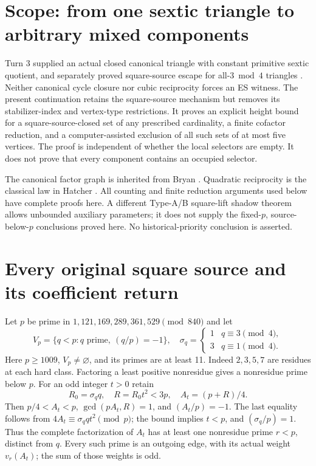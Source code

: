 \section{Scope: from one sextic triangle to arbitrary mixed components}
Turn 3 supplied an actual closed canonical triangle with constant primitive sextic
quotient, and separately proved square-source escape for all-$3\bmod4$ triangles
\cite{Turn3}. Neither canonical cycle closure nor cubic reciprocity forces an ES
witness. The present continuation retains the square-source mechanism but removes
its stabilizer-index and vertex-type restrictions. It proves an explicit height
bound for a square-source-closed set of any prescribed cardinality, a finite
cofactor reduction, and a computer-assisted exclusion of all such sets of at most
five vertices. The proof is independent of whether the local selectors are empty.
It does not prove that every component contains an occupied selector.

The canonical factor graph is inherited from Bryan \cite[\S\S1--7]{Bryan}.
Quadratic reciprocity is the classical law in Hatcher \cite[\S6.4, pp.205--212]{Hatcher}.
All counting and finite reduction arguments used below have complete proofs here.
A different Type-A/B square-lift shadow theorem \cite[\S\S3--6]{Shadow} allows
unbounded auxiliary parameters; it does not supply the fixed-$p$, source-below-$p$
conclusions proved here. No historical-priority conclusion is asserted.

\section{Every original square source and its coefficient return}
Let $p$ be prime in $1,121,169,289,361,529\pmod{840}$ and let
\[
 V_p=\{q<p:q\text{ prime},\ (q/p)=-1\},\quad
 \sigma_q=\begin{cases}1&q\equiv3\pmod4,\\3&q\equiv1\pmod4.\end{cases}
\]
Here $p\ge1009$, $V_p\ne\varnothing$, and its primes are at least 11.
Indeed $2,3,5,7$ are residues at each hard class. Factoring a least positive
nonresidue gives a nonresidue prime below $p$. For an odd integer $t>0$ retain
\[
 R_0=\sigma_q q,\quad R=R_0t^2<3p,\quad A_t=(p+R)/4.
                                                        \tag{1}
\]
Then $p/4<A_t<p$, $\gcd(pA_t,R)=1$, and $(A_t/p)=-1$. The last equality follows
from $4A_t\equiv\sigma_q q t^2\pmod p$; the bound implies $t<p$, and
$(\sigma_q/p)=1$. Thus the complete factorization of $A_t$ has at least one
nonresidue prime $r<p$, distinct from $q$. Every such prime is an outgoing edge,
with its actual weight $v_r(A_t)$; the sum of those weights is odd.

